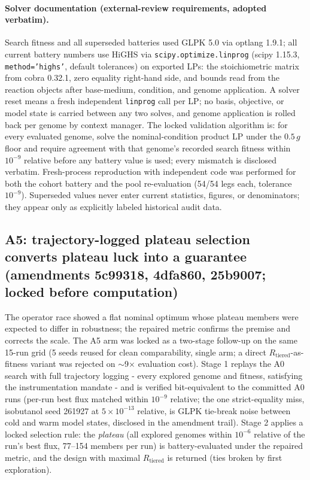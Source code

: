 \documentclass[12pt,a4paper]{article}
\begin{document}
\paragraph{Solver documentation (external-review requirements, adopted verbatim).} Search fitness and all superseded batteries used GLPK 5.0 via optlang 1.9.1; all current battery numbers use HiGHS via \texttt{scipy.optimize.linprog} (scipy 1.15.3, \texttt{method='highs'}, default tolerances) on exported LPs: the stoichiometric matrix from cobra 0.32.1, zero equality right-hand side, and bounds read from the reaction objects after base-medium, condition, and genome application. A solver reset means a fresh independent \texttt{linprog} call per LP; no basis, objective, or model state is carried between any two solves, and genome application is rolled back per genome by context manager. The locked validation algorithm is: for every evaluated genome, solve the nominal-condition product LP under the $0.5\,g$ floor and require agreement with that genome's recorded search fitness within $10^{-9}$ relative before any battery value is used; every mismatch is disclosed verbatim. Fresh-process reproduction with independent code was performed for both the cohort battery and the pool re-evaluation (54/54 legs each, tolerance $10^{-9}$). Superseded values never enter current statistics, figures, or denominators; they appear only as explicitly labeled historical audit data.

\subsection{A5: trajectory-logged plateau selection converts plateau luck into a guarantee (amendments 5c99318, 4dfa860, 25b9007; locked before computation)}
The operator race showed a flat nominal optimum whose plateau members were expected to differ in robustness; the repaired metric confirms the premise and corrects the scale. The A5 arm was locked as a two-stage follow-up on the same 15-run grid (5 seeds reused for clean comparability, single arm; a direct $R_{\mathrm{tiered}}$-as-fitness variant was rejected on $\sim$9$\times$ evaluation cost). Stage 1 replays the A0 search with full trajectory logging - every explored genome and fitness, satisfying the instrumentation mandate - and is verified bit-equivalent to the committed A0 runs (per-run best flux matched within $10^{-9}$ relative; the one strict-equality miss, isobutanol seed 261927 at $5\times10^{-13}$ relative, is GLPK tie-break noise between cold and warm model states, disclosed in the amendment trail). Stage 2 applies a locked selection rule: the \emph{plateau} (all explored genomes within $10^{-6}$ relative of the run's best flux, 77--154 members per run) is battery-evaluated under the repaired metric, and the design with maximal $R_{\mathrm{tiered}}$ is returned (ties broken by first exploration).
\end{document}
